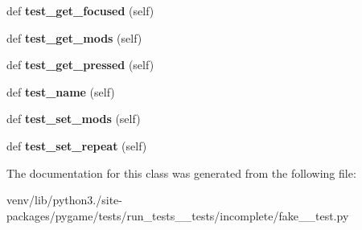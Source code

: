 \begin{DoxyCompactItemize}
\item 
\mbox{\label{classpygame_1_1tests_1_1run__tests____tests_1_1incomplete_1_1fake__3__test_1_1_key_module_test_a4f1ab94a8604ed932865445ac8f02abd}} 
def {\bfseries test\+\_\+get\+\_\+focused} (self)
\item 
\mbox{\label{classpygame_1_1tests_1_1run__tests____tests_1_1incomplete_1_1fake__3__test_1_1_key_module_test_a2949678bdec203792ae6c2491fbd12ed}} 
def {\bfseries test\+\_\+get\+\_\+mods} (self)
\item 
\mbox{\label{classpygame_1_1tests_1_1run__tests____tests_1_1incomplete_1_1fake__3__test_1_1_key_module_test_ac7e23207b8831b8898145b8126d98285}} 
def {\bfseries test\+\_\+get\+\_\+pressed} (self)
\item 
\mbox{\label{classpygame_1_1tests_1_1run__tests____tests_1_1incomplete_1_1fake__3__test_1_1_key_module_test_aaa389823f41518d513e226ba0f51fe9b}} 
def {\bfseries test\+\_\+name} (self)
\item 
\mbox{\label{classpygame_1_1tests_1_1run__tests____tests_1_1incomplete_1_1fake__3__test_1_1_key_module_test_ae37a930cedb27545dcf2035f2628f648}} 
def {\bfseries test\+\_\+set\+\_\+mods} (self)
\item 
\mbox{\label{classpygame_1_1tests_1_1run__tests____tests_1_1incomplete_1_1fake__3__test_1_1_key_module_test_a815db59eccadf1df1613600fcbc49048}} 
def {\bfseries test\+\_\+set\+\_\+repeat} (self)
\end{DoxyCompactItemize}


The documentation for this class was generated from the following file\+:\begin{DoxyCompactItemize}
\item 
venv/lib/python3./site-\/packages/pygame/tests/run\+\_\+tests\+\_\+\+\_\+tests/incomplete/fake\+\_\+\_\+test.\+py\end{DoxyCompactItemize}
